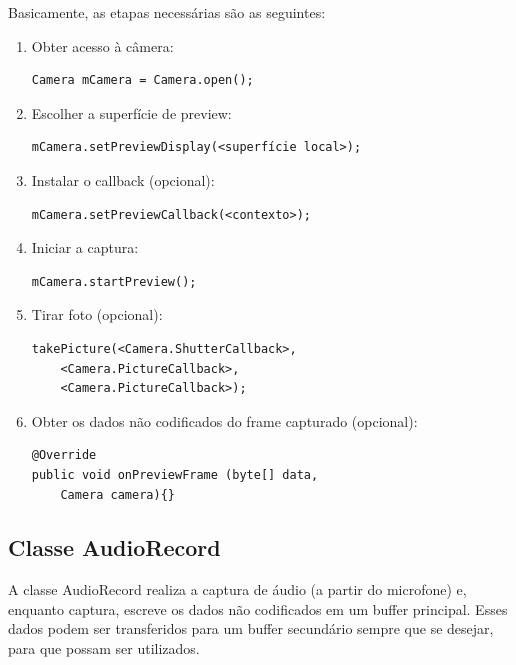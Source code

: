 \documentclass{acm_proc_article-sp}
\begin{document}
Basicamente, as etapas necessárias são as seguintes:
\begin{enumerate}
 \item Obter acesso à câmera:
  \begin{verbatim}
Camera mCamera = Camera.open();
  \end{verbatim}
 \item Escolher a superfície de preview:
  \begin{verbatim}
mCamera.setPreviewDisplay(<superfície local>);
  \end{verbatim}
 \item Instalar o callback (opcional):
  \begin{verbatim}
mCamera.setPreviewCallback(<contexto>);
  \end{verbatim}
 \item Iniciar a captura:
  \begin{verbatim}
mCamera.startPreview();
  \end{verbatim}
 \item Tirar foto (opcional):
  \begin{verbatim}
takePicture(<Camera.ShutterCallback>,
    <Camera.PictureCallback>,
    <Camera.PictureCallback>);
  \end{verbatim}
 \item Obter os dados não codificados do frame capturado (opcional):
  \begin{verbatim}
@Override
public void onPreviewFrame (byte[] data, 
    Camera camera){}
  \end{verbatim}
\end{enumerate}


\subsection{Classe AudioRecord}
A classe AudioRecord realiza a captura de áudio (a partir do microfone) e, enquanto captura, escreve os dados não codificados em um buffer principal. Esses dados podem ser transferidos para um buffer secundário sempre que se desejar, para que possam ser utilizados.
\end{document}
